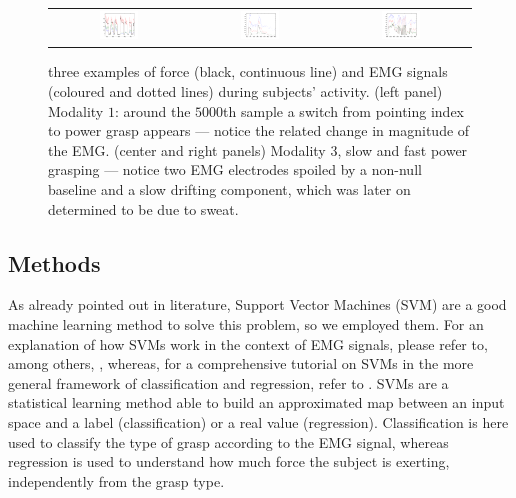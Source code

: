 \begin{figure}[!ht] \centering
  \begin{tabular}{ccc}
    \includegraphics[width=0.3\textwidth]{figs/example_signal1} &
    \includegraphics[width=0.3\textwidth]{figs/example_signal2} &
    \includegraphics[width=0.3\textwidth]{figs/example_signal3} \\
  \end{tabular}
  \caption{three examples of force (black, continuous line) and EMG
    signals (coloured and dotted lines) during subjects'
    activity. (left panel) Modality $1$: around the $5000$th sample a
    switch from pointing index to  power grasp appears --- notice the
    related change in magnitude of the EMG. (center
    and right panels) Modality $3$, slow and fast power grasping ---
    notice two EMG electrodes spoiled by a non-null baseline and a
    slow drifting component, which was later on determined to be due
    to sweat.}
  \label{fig:ex_signals}
\end{figure}

\subsection{Methods}

As already pointed out in literature, Support Vector Machines (SVM)
\cite{BGV92} are a good machine learning method to solve this problem,
so we employed them. For an explanation of how SVMs work in the
context of EMG signals, please refer to, among others,
\cite{2008.ICRA,2008.BioCyb}, whereas, for a comprehensive tutorial on
SVMs in the more general framework of classification and regression,
refer to \cite{Burges98,SmolaTut2004}. SVMs are a statistical learning
method able to build an approximated map between an input space and a
label (classification) or a real value (regression). Classification is
here used to classify the type of grasp according to the EMG signal,
whereas regression is used to understand how much force the subject is
exerting, independently from the grasp type.

